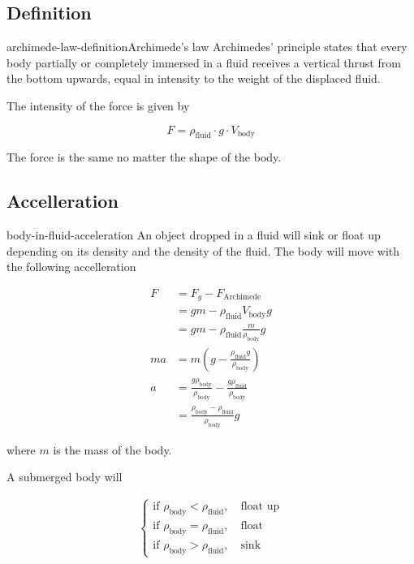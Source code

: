 \documentclass[preview]{standalone}
\begin{document}
\subsection{Definition}

\begin{snippetdefinition}{archimede-law-definition}{Archimede's law}
    Archimedes' principle states that
    every body partially or completely immersed in a fluid receives a
    vertical thrust from the bottom upwards,
    equal in intensity to the weight of the displaced fluid.

    The intensity of the force is given by

    \[
        F = \rho_\text{fluid} \cdot g \cdot V_\text{body}
    \]

    The force is the same no matter the shape of the body.
\end{snippetdefinition}

\subsection{Accelleration}

\begin{snippet}{body-in-fluid-acceleration}
    An object dropped in a fluid will sink or float up
    depending on its density and the density of the fluid.
    The body will move with the following accelleration

    \begin{align*}
        F &= F_g - F_\text{Archimede} \\
        &= gm - \rho_\text{fluid}V_\text{body}g \\
        &= gm - \rho_\text{fluid}\frac{m}{\rho_\text{body}}g \\
        ma &= m \left( g- \frac{\rho_\text{fluid}g}{\rho_\text{body}} \right) \\
        a &= \frac{g\rho_\text{body}}{\rho_\text{body}} - \frac{g\rho_\text{fluid}}{\rho_\text{body}} \\
        &= \frac{\rho_\text{body} - \rho_\text{fluid}}{\rho_\text{body}}g
    \end{align*}

    where \(m\) is the mass of the body.

    A submerged body will

    \begin{align*}
        \begin{cases}
            \text{if } \rho_\text{body} < \rho_\text{fluid},\quad \text{float up} \\
            \text{if } \rho_\text{body} = \rho_\text{fluid},\quad \text{float} \\
            \text{if } \rho_\text{body} > \rho_\text{fluid},\quad \text{sink}
        \end{cases}
    \end{align*}
    \phantom{}
\end{snippet}
\end{document}
